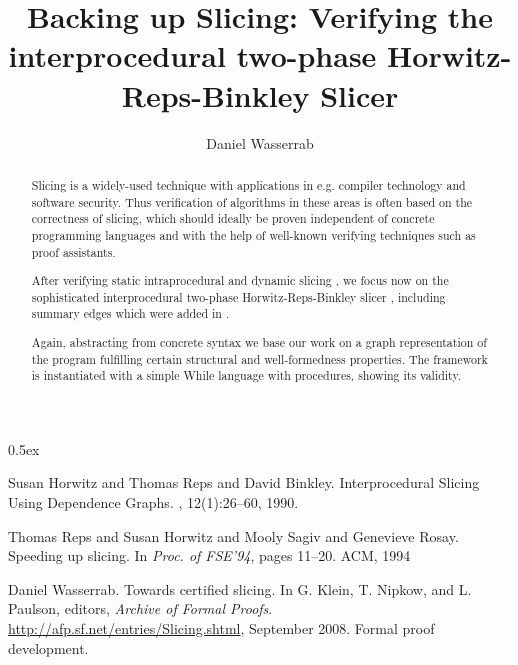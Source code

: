\documentclass[11pt,a4paper,notitlepage]{report}
\begin{document}
\title{Backing up Slicing: Verifying the interprocedural two-phase Horwitz-Reps-Binkley Slicer}
\author{Daniel Wasserrab}
\maketitle

\begin{abstract}
Slicing is a widely-used technique with applications in e.g. compiler
technology and software security. Thus verification of
algorithms in these areas is often based on the correctness of slicing,
which should ideally be proven independent of concrete programming
languages and with the help of well-known verifying techniques such as
proof assistants. 

After verifying static intraprocedural and dynamic slicing \cite{Wasserrab:08}, we
focus now on the sophisticated interprocedural two-phase Horwitz-Reps-Binkley slicer
\cite{HorwitzRB:88}, including summary edges which were added in \cite{RepsHSR:94}.

Again, abstracting from concrete syntax we base our work on a graph
representation of the program fulfilling certain structural
and well-formedness properties. The framework is instantiated with a simple 
While language with procedures, showing its validity.
\end{abstract}

\parindent 0pt\parskip 0.5ex



\begin{thebibliography}{10}

Susan Horwitz and Thomas Reps and David Binkley.
\newblock Interprocedural Slicing Using Dependence Graphs.
, 12(1):26--60, 1990.

Thomas Reps and Susan Horwitz and Mooly Sagiv and Genevieve Rosay.
\newblock Speeding up slicing.
\newblock In {\em Proc. of FSE'94}, pages 11--20. ACM, 1994

\newblock Daniel Wasserrab.
\newblock Towards certified slicing.
\newblock In G. Klein, T. Nipkow, and L. Paulson, editors, {\em Archive of Formal
Proofs}.
\newblock \url{http://afp.sf.net/entries/Slicing.shtml}, September 2008.
\newblock Formal proof development.

\end{thebibliography}
\end{document}
